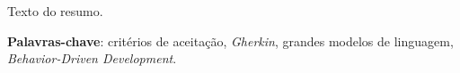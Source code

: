 \begin{resumo}

 Texto do resumo.

 \vspace{\onelineskip}

 \noindent
 \textbf{Palavras-chave}: critérios de aceitação, \textit{Gherkin}, grandes modelos de linguagem, \textit{Behavior-Driven Development}.
\end{resumo}
